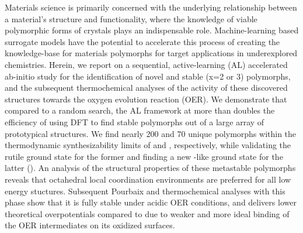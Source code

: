 





%
Materials science is primarily concerned with the underlying relationship between a material's structure and functionality,
where the knowledge of viable polymorphic forms of crystals plays an indispensable role.
%
Machine-learning based surrogate models have the potential to accelerate this process of creating the knowledge-base for materials polymorphs for target applications in underexplored chemistries.
%
Herein, we report on a sequential, active-learning (AL) accelerated ab-initio study for the identification of novel and stable \IrOx (x=2 or 3) polymorphs,
and the subsequent thermochemical analyses of the activity of these discovered structures towards the oxygen evolution reaction (OER).
%
We demonstrate that compared to a random search,
the AL framework at more than doubles the efficiency of using DFT to find stable polymorphs out of a large array of prototypical structures.
%
We find nearly \num{200} and \num{70} unique polymorphs within the thermodynamic synthesizability limits of \IrOtwo and \IrOthree, respectively,
while validating the rutile ground state for the former and finding a new -like ground state for the latter (\aIrOthree).
%
An analysis of the structural properties of these metastable polymorphs reveals that octahedral local coordination environments are preferred for all low energy stuctures.
%
Subsequent Pourbaix and thermochemical analyses with this \aIrOthree phase show that it is fully stable under acidic OER conditions,
and delivers lower theoretical overpotentials compared to \rIrOtwo due to weaker and more ideal binding of the OER intermediates on its oxidized surfaces.
